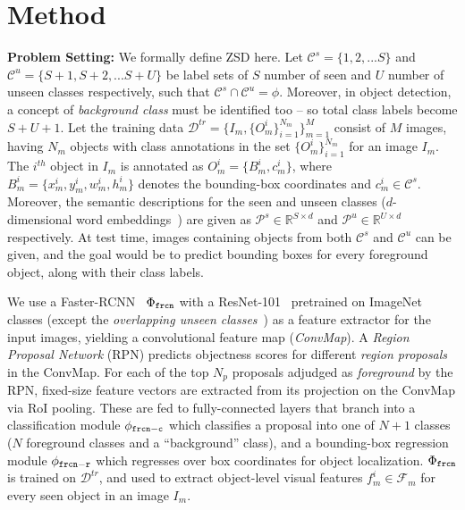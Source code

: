\documentclass{bmvc2k}
\begin{document}
\section{Method}
\label{sec:method}
{\bf Problem Setting:} We formally define ZSD here. Let $\mathcal{C}^s = \{ 1,2,...S \}$ and $\mathcal{C}^u = \{ S+1, S+2,...S+U \}$ be label sets of $S$ number of seen and $U$ number of unseen classes respectively, such that $\mathcal{C}^s \cap \mathcal{C}^u = \phi$. Moreover, in object detection, a concept of {\em background class} must be identified too -- so total class labels become $S+U+1$.  Let the training data $\mathcal{D}^{tr} = \{I_m, \{O_m^i \}_{i = 1}^{N_m}  \}_{m = 1}^{M}$ consist of $M$ images, having $N_m$ objects with class annotations in the set $\{O_m^i \}_{i = 1}^{N_m}$ for an image $I_m$. The $i^{th}$ object in $I_m$ is annotated as $O_m^i = \{B_m^i, c_m^i\}$, where $B_m^i = \{x_m^i, y_m^i, w_m^i, h_m^i \}$ denotes the bounding-box coordinates and $c_m^i \in \mathcal{C}^s$. 
Moreover, the semantic descriptions for the seen and unseen classes ($d$-dimensional word embeddings~\cite{mikolov2013distributed, pennington2014glove, joulin-etal-2017-bag}) are given as $\mathcal{P}^{s} \in \mathbb{R}^{S \times d}$ and $\mathcal{P}^{u} \in \mathbb{R}^{U \times d}$ respectively. At test time, images containing objects from both $\mathcal{C}^s$ and $\mathcal{C}^u$ can be given, and the goal would be to predict bounding boxes for every foreground object, along with their class labels. 

We use a Faster-RCNN~\cite{ren2016faster} $\Phi_{\tt frcn}$ with a ResNet-101~\cite{he2016deep} pretrained on ImageNet~\cite{russakovsky2015imagenet} classes (except the {\em overlapping unseen classes}~\cite{xian2018zero}) as a feature extractor for the input images, yielding a convolutional feature map ({\em ConvMap}). A {\em Region Proposal Network} (RPN) predicts objectness scores for different {\em region proposals} in the ConvMap. For each of the top $N_p$ proposals adjudged as {\em foreground} by the RPN, fixed-size feature vectors are extracted from its projection on the ConvMap via RoI pooling. These are fed to fully-connected layers that branch into a classification module $\phi_{\tt frcn-c}$ which classifies a proposal into one of $N+1$ classes ($N$ foreground classes and a ``background'' class), and a bounding-box regression module $\phi_{\tt frcn-r}$ which regresses over box coordinates for object localization. $\Phi_{\tt frcn}$ is trained on $\mathcal{D}^{tr}$, and used to extract object-level visual features $f^i_m \in \mathcal{F}_m $ for every seen object in an image $I_m$. 
\end{document}
